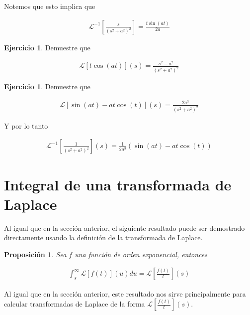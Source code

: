 \documentclass{article}
\theoremstyle{plain}
\newtheorem{prop}[thm]{Proposición}
\theoremstyle{definition}
\newtheorem{ejer}[thm]{Ejercicio}
\begin{document}
Notemos que esto implica que

\begin{align*}
    \mathcal{L}^{-1} \left[\frac{s}{(s^2+a^2)^2} \right] = \frac{t\sin(at)}{2a}
\end{align*}


\begin{ejer}Demuestre que
\end{ejer}

\begin{align*}
    \mathcal{L}[t\cos(at)](s) = \frac{s^2-a^2}{(s^2+a^2)^2}
\end{align*}



\begin{ejer}Demuestre que
\end{ejer}

\begin{align*}
    \mathcal{L}[\sin(at)-at\cos(t)](s) = \frac{2a^3}{(s^2+a^2)^2}
\end{align*}

Y por lo tanto

\begin{align*}
    \mathcal{L}^{-1}\left[ \frac{1}{(s^2+a^2)^2}\right](s)  =\frac{1}{2a^3}(\sin(at)-at\cos(t))
\end{align*}

\newpage


\section{Integral de una transformada de Laplace}


Al igual que en la sección anterior, el siguiente resultado puede ser demostrado directamente usando la definición de la transformada de Laplace. \\

\begin{prop}Sea $f$ una función de orden exponencial, entonces
\end{prop}

\begin{align*}
    \int_s^\infty \mathcal{L}[f(t)] (u) du = \mathcal{L}\left[ \frac{f(t)}{t}\right](s)
\end{align*}


Al igual que en la sección anterior, este resultado nos sirve principalmente para calcular transformadas de Laplace de la forma $\displaystyle \mathcal{L}\left[ \frac{f(t)}{t}\right](s)$. \\
\end{document}
